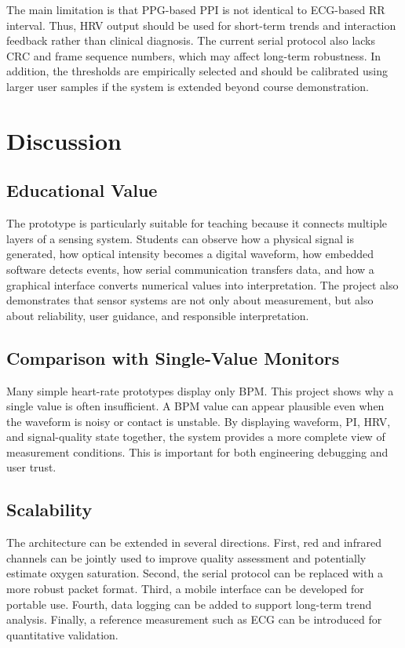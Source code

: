 \documentclass[10pt,conference]{IEEEtran}
\begin{document}
The main limitation is that PPG-based PPI is not identical to ECG-based RR interval. Thus, HRV output should be used for short-term trends and interaction feedback rather than clinical diagnosis. The current serial protocol also lacks CRC and frame sequence numbers, which may affect long-term robustness. In addition, the thresholds are empirically selected and should be calibrated using larger user samples if the system is extended beyond course demonstration.

\section{Discussion}
\subsection{Educational Value}
The prototype is particularly suitable for teaching because it connects multiple layers of a sensing system. Students can observe how a physical signal is generated, how optical intensity becomes a digital waveform, how embedded software detects events, how serial communication transfers data, and how a graphical interface converts numerical values into interpretation. The project also demonstrates that sensor systems are not only about measurement, but also about reliability, user guidance, and responsible interpretation.

\subsection{Comparison with Single-Value Monitors}
Many simple heart-rate prototypes display only BPM. This project shows why a single value is often insufficient. A BPM value can appear plausible even when the waveform is noisy or contact is unstable. By displaying waveform, PI, HRV, and signal-quality state together, the system provides a more complete view of measurement conditions. This is important for both engineering debugging and user trust.

\subsection{Scalability}
The architecture can be extended in several directions. First, red and infrared channels can be jointly used to improve quality assessment and potentially estimate oxygen saturation. Second, the serial protocol can be replaced with a more robust packet format. Third, a mobile interface can be developed for portable use. Fourth, data logging can be added to support long-term trend analysis. Finally, a reference measurement such as ECG can be introduced for quantitative validation.
\end{document}
